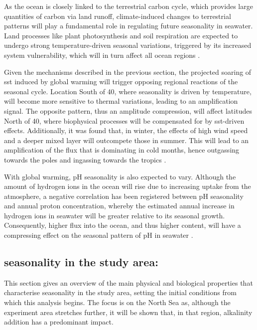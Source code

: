 As the ocean is closely linked to the terrestrial carbon cycle, which provides large quantities of carbon via land runoff, climate-induced changes to terrestrial patterns will play a fundamental role in regulating future  seasonality in seawater. Land processes like plant photosynthesis and soil respiration are expected to undergo strong temperature-driven seasonal variations, triggered by its increased system vulnerability, which will in turn affect all ocean regions \citep{liu2017seasonal}. 

Given the mechanisms described in the previous section, the projected soaring of \ac{sst} induced by global warming will trigger opposing regional reactions of the  seasonal cycle. Location South of 40\textdegree{}, where seasonality is driven by temperature, will become more sensitive to thermal variations, leading to an amplification signal. The opposite pattern, thus an amplitude compression, will affect latitudes North of 40\textdegree{}, where biophysical processes will be compensated for by \ac{sst}-driven effects. Additionally, it was found that, in winter, the effects of high wind speed and a deeper mixed layer will outcompete those in summer. This will lead to an amplification of the flux that is dominating in cold months, hence outgassing towards the poles and ingassing towards the tropics \citep{fassbender2022quantifying}. 

With global warming, pH seasonality is also expected to vary. Although the amount of hydrogen ions in the ocean will rise due to increasing  uptake from the atmosphere, a negative correlation has been registered between pH seasonality and annual proton concentration, whereby the estimated annual increase in hydrogen ions in seawater will be greater relative to its seasonal growth. Consequently, higher  flux into the ocean, and thus higher  content, will have a compressing effect on the seasonal pattern of pH in seawater \citep{kwiatkowski2022modified, kwiatkowski2018diverging}. 

\subsection{ seasonality in the study area:}

This section gives an overview of the main physical and biological properties that characterise  seasonality in the study area, setting the initial conditions from which this analysis begins. The focus is on the North Sea as, although the experiment area stretches further, it will be shown that, in that region, alkalinity addition has a predominant impact. 

